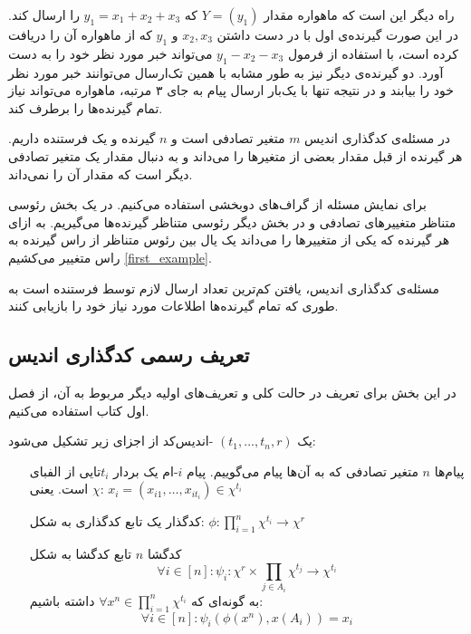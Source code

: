 \noindent
راه دیگر این است که ماهواره مقدار
$Y = (y_1)$
که
$y_1 = x_1 + x_2 + x_3$
را ارسال کند. در این صورت گیرنده‌ی اول با در دست داشتن
$x_2, x_3$
و 
$y_1$
که از ماهواره آن را دریافت کرده است، با استفاده از فرمول
$y_1 - x_2 - x_3$
می‌تواند خبر مورد نظر خود را به دست آورد. دو گیرنده‌ی دیگر نیز به طور مشابه با همین تک‌ارسال می‌توانند خبر مورد نظر خود را بیابند و در نتیجه تنها با یک‌بار ارسال پیام به جای ۳ مرتبه، ماهواره می‌تواند نیاز تمام گیرنده‌ها را برطرف کند.

در مسئله‌ی کدگذاری اندیس
$m$
متغیر تصادفی است و
$n$
گیرنده و یک فرستنده داریم. هر گیرنده از قبل مقدار بعضی از متغیرها را می‌داند و به دنبال مقدار یک متغیر تصادفی دیگر است که مقدار آن را نمی‌داند.

\noindent
برای نمایش مسئله از گراف‌های دوبخشی استفاده می‌کنیم. در یک بخش رئوسی متناظر متغییرهای تصادفی و در بخش دیگر رئوسی متناظر گیرنده‌ها می‌گیریم. به ازای هر گیرنده که یکی از متغییرها را می‌داند یک یال بین رئوس متناظر از راس گیرنده به راس متغییر می‌کشیم
\autoref{first_example}.

مسئله‌ی کدگذاری اندیس، یافتن کم‌ترین تعداد ارسال لازم توسط فرستنده است به طوری که تمام گیرنده‌ها اطلاعات مورد نیاز خود را بازیابی کنند.
	\subsection{تعریف رسمی کدگذاری اندیس}
در این بخش برای تعریف
\icod
در حالت کلی و تعریف‌های اولیه دیگر مربوط به آن، از فصل اول کتاب
\cite{fatemehbook}
استفاده می‌کنیم.
\begin{definition}
	\label{def:icod}
	یک
	$(t_1, \ldots, t_n, r)$
	-اندیس‌کد از اجزای زیر تشکیل می‌شود:
	\begin{itemize}
		\item [
      پیام‌ها
        ]
		$n$
		 متغیر تصادفی که به آن‌ها پیام می‌گوییم. پیام
		  $i$-ام
            یک بردار 
		  $t_i$تایی
            از الفبای
		  $\chi$
		  است. یعنی:
		  $x_i = (x_{i1}, \ldots, x_{it_i}) \in \chi^{t_i}$
		  \item[
		  کدگذار
		  ]
		   یک تابع کدگذاری به شکل:
		   $\phi: \prod\limits_{i = 1}^n \chi^{t_i}  \rightarrow \chi^r$
		  \item[
		  کدگشا
		  ]
		  $n$
		  تابع کدگشا به شکل
		  $$\forall i \in [n]: \psi_i: \chi^r \times  \prod\limits_{j \in A_i} \chi^{t_j} \rightarrow \chi^{t_i}$$
		  به گونه‌ای که 
		  $\forall x^n \in \prod\limits_{i = 1}^{n} \chi^{t_i}$
		  داشته باشیم:
		  $$\forall i \in [n]: \psi_i(\phi(x^n), x(A_i)) = x_i$$
	\end{itemize}
\end{definition}


